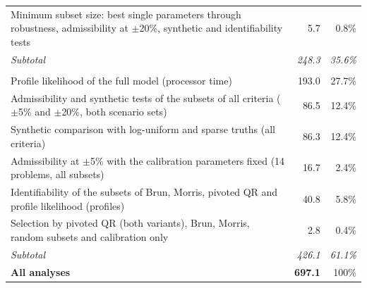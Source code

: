 \begin{longtable}{@{}>{\raggedright\arraybackslash}p{11.2cm}rr@{}}
\quad Minimum subset size: best single parameters through robustness, admissibility at $\pm$20\%, synthetic and identifiability tests & 5.7 & 0.8\% \\
\quad \emph{Subtotal} & \emph{248.3} & \emph{35.6\%} \\
\addlinespace
\multicolumn{3}{@{}l}{\textbf{Comparison with other criteria}} \\
\quad Profile likelihood of the full model (processor time) & 193.0 & 27.7\% \\
\quad Admissibility and synthetic tests of the subsets of all criteria ($\pm$5\% and $\pm$20\%, both scenario sets) & 86.5 & 12.4\% \\
\quad Synthetic comparison with log-uniform and sparse truths (all criteria) & 86.3 & 12.4\% \\
\quad Admissibility at $\pm$5\% with the calibration parameters fixed (14 problems, all subsets) & 16.7 & 2.4\% \\
\quad Identifiability of the subsets of Brun, Morris, pivoted QR and profile likelihood (profiles) & 40.8 & 5.8\% \\
\quad Selection by pivoted QR (both variants), Brun, Morris, random subsets and calibration only & 2.8 & 0.4\% \\
\quad \emph{Subtotal} & \emph{426.1} & \emph{61.1\%} \\
\addlinespace
\midrule
\textbf{All analyses} & \textbf{697.1} & 100\% \\
\bottomrule
\end{longtable}
